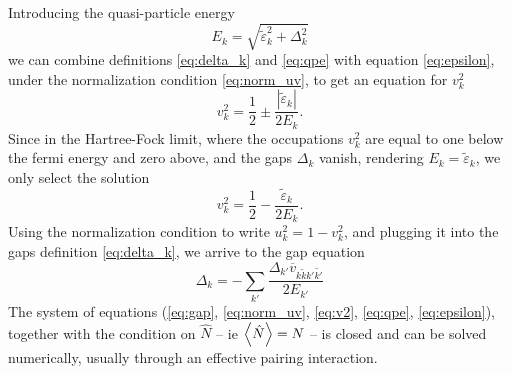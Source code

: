 Introducing the quasi-particle energy
\begin{equation}
    \label{eq:qpe}
    E_k = \sqrt{\tilde \varepsilon_k^2 +\Delta_k^2}
\end{equation}
we can combine definitions \eqref{eq:delta_k} and \eqref{eq:qpe} with equation \eqref{eq:epsilon}, under the normalization condition \eqref{eq:norm_uv}, to get an equation for $v_k^2$
\begin{equation}
    \label{eq:v2}
    v_k^2 = \frac 1 2 \pm \frac{|\tilde \varepsilon_k|}{2E_k}.
\end{equation}
Since in the Hartree-Fock limit, where the occupations $v_k^2$ are equal to one below the fermi energy and zero above, and the gaps $\Delta_k$ vanish, rendering $E_k=\tilde \varepsilon_k$, we only select the solution
\begin{equation}
v_k^2 = \frac 1 2 - \frac{\tilde \varepsilon_k}{2E_k}.
\end{equation}
Using the normalization condition to write $u_k^2=1-v_k^2$, and plugging it into the gaps definition \eqref{eq:delta_k}, we arrive to the gap equation
\begin{equation}
    \label{eq:gap}
    \Delta_k = - \sum_{k'}\frac{\Delta_{k'}\overline v_{k\tilde k k'\tilde{k'}}}{2E_{k'}}
\end{equation}
The system of equations (\ref{eq:gap}, \ref{eq:norm_uv}, \ref{eq:v2}, \ref{eq:qpe}, \ref{eq:epsilon}), together with the condition on $\hat N$ -- ie $\expval{\hat N}=N$ -- is closed and can be solved numerically, usually through an effective pairing interaction.
